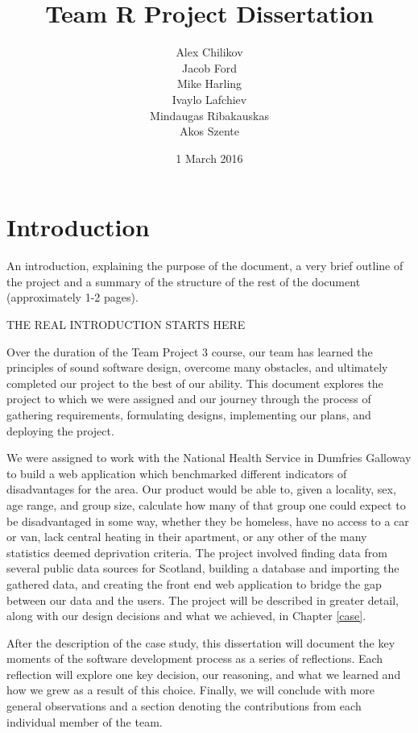 \documentclass{l3proj}
\begin{document}
\title{Team R Project Dissertation}
\author{Alex Chilikov \\
        Jacob Ford \\
        Mike Harling \\
        Ivaylo Lafchiev \\
        Mindaugas Ribakauskas \\
        Akos Szente}
\date{1 March 2016}
\maketitle
\educationalconsent
\tableofcontents
\chapter{Introduction}
\label{intro}

An introduction, explaining the purpose of the document, a very brief outline of the project and a summary of the structure of the rest of the document (approximately 1-2 pages).

THE REAL INTRODUCTION STARTS HERE

Over the duration of the Team Project 3 course, our team has learned the principles of sound software design, overcome many obstacles, and ultimately completed our project to the best of our ability. This document explores the project to which we were assigned and our journey through the process of gathering requirements, formulating designs, implementing our plans, and deploying the project.

We were assigned to work with the National Health Service in Dumfries Galloway to build a web application which benchmarked different indicators of disadvantages for the area. Our product would be able to, given a locality, sex, age range, and group size, calculate how many of that group one could expect to be disadvantaged in some way, whether they be homeless, have no access to a car or van, lack central heating in their apartment, or any other of the many statistics deemed deprivation criteria. The project involved finding data from several public data sources for Scotland, building a database and importing the gathered data, and creating the front end web application to bridge the gap between our data and the users. The project will be described in greater detail, along with our design decisions and what we achieved, in Chapter \ref{case}.

After the description of the case study, this dissertation will document the key moments of the software development process as a series of reflections. Each reflection will explore one key decision, our reasoning, and what we learned and how we grew as a result of this choice. Finally, we will conclude with more general observations and a section denoting the contributions from each individual member of the team.
\end{document}
